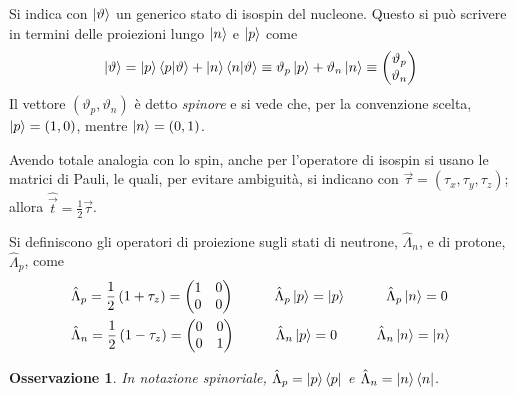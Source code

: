 \documentclass[11pt, a4paper]{scrartcl}
\theoremstyle{style}
\newtheorem{osservazione}{Osservazione}[section]
\numberwithin{equation}{subsection}
\begin{document}
Si indica con $\ket{\vartheta } $ un generico stato di isospin del nucleone. 
Questo si pu\`o scrivere in termini delle proiezioni lungo $\ket{n} $ e $\ket{p} $ come
\[
\ket{\vartheta }  = \ket{p} \braket{p|\vartheta }  + \ket{n} \braket{n|\vartheta } \equiv \vartheta _p \ket{p}  + \vartheta _n \ket{n} \equiv \begin{pmatrix} \vartheta _p \\ \vartheta _n\end{pmatrix} 
\] 
Il vettore $(\vartheta _p,\vartheta _n)$ \`e detto \textit{spinore} e si vede che, per la convenzione scelta, $\ket{p} = (1,0)$, mentre $\ket{n} = (0,1)$.

Avendo totale analogia con lo spin, anche per l'operatore di isospin si usano le matrici di Pauli, le quali, per evitare ambiguit\`a, si indicano con $\vec{\tau } = (\tau _x, \tau _y,\tau _z)$; allora $\hat{\vec{t}} = \frac{1}{2} \vec{\tau }$.

Si definiscono gli operatori di proiezione sugli stati di neutrone, $\hat{\Lambda }_n$, e di protone, $\hat{\Lambda }_p$, come
\[
	\begin{split}
		&\hat{\Lambda }_p = \frac{1}{2} \left(1 + \tau _z\right) = \begin{pmatrix} 1 & 0 \\ 0 & 0  \end{pmatrix}  \hspace{1cm} \hat{\Lambda }_p \ket{p} = \ket{p}  \hspace{1cm} \hat{\Lambda}_p \ket{n}  = 0 \\
		& \hat{\Lambda }_n = \frac{1}{2} \left(1 - \tau _z\right)  = \begin{pmatrix} 0 & 0 \\ 0& 1  \end{pmatrix}  \hspace{1cm} \hat{\Lambda }_n \ket{ p}  = 0 \hspace{1cm} \hat{\Lambda }_n \ket{n}  = \ket{n} 
	\end{split}
\] 
\begin{osservazione}
In notazione spinoriale, $\hat{\Lambda }_p = \ket{p} \bra{p} $ e $\hat{\Lambda }_n = \ket{n} \bra{n} $.
\end{osservazione}
\end{document}
